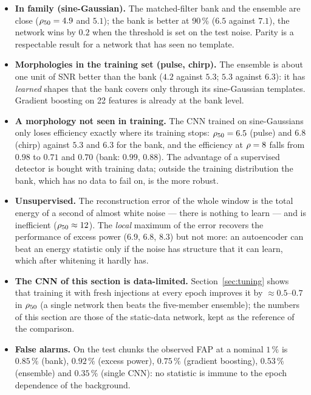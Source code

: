 \begin{itemize}[nosep]
\item \textbf{In family (sine-Gaussian).} The matched-filter bank and the ensemble are close ($\rho_{50}=4.9$ and $5.1$); the bank is better at 90\,\% ($6.5$ against $7.1$), the network wins by $0.2$ when the threshold is set on the test noise. Parity is a respectable result for a network that has seen no template.
\item \textbf{Morphologies in the training set (pulse, chirp).} The ensemble is about one unit of SNR better than the bank ($4.2$ against $5.3$; $5.3$ against $6.3$): it has \emph{learned} shapes that the bank covers only through its sine-Gaussian templates. Gradient boosting on 22 features is already at the bank level.
\item \textbf{A morphology not seen in training.} The CNN trained on sine-Gaussians only loses efficiency exactly where its training stops: $\rho_{50}=6.5$ (pulse) and $6.8$ (chirp) against $5.3$ and $6.3$ for the bank, and the efficiency at $\rho=8$ falls from $0.98$ to $0.71$ and $0.70$ (bank: $0.99$, $0.88$). The advantage of a supervised detector is bought with training data; outside the training distribution the bank, which has no data to fail on, is the more robust.
\item \textbf{Unsupervised.} The reconstruction error of the whole window is the total energy of a second of almost white noise --- there is nothing to learn --- and is inefficient ($\rho_{50}\approx12$). The \emph{local} maximum of the error recovers the performance of excess power ($6.9$, $6.8$, $8.3$) but not more: an autoencoder can beat an energy statistic only if the noise has structure that it can learn, which after whitening it hardly has.
\item \textbf{The CNN of this section is data-limited.} Section~\ref{sec:tuning} shows that training it with fresh injections at every epoch improves it by $\approx0.5$--$0.7$ in $\rho_{50}$ (a single network then beats the five-member ensemble); the numbers of this section are those of the static-data network, kept as the reference of the comparison.
\item \textbf{False alarms.} On the test chunks the observed FAP at a nominal $1\,\%$ is $0.85\,\%$ (bank), $0.92\,\%$ (excess power), $0.75\,\%$ (gradient boosting), $0.53\,\%$ (ensemble) and $0.35\,\%$ (single CNN): no statistic is immune to the epoch dependence of the background.
\end{itemize}

